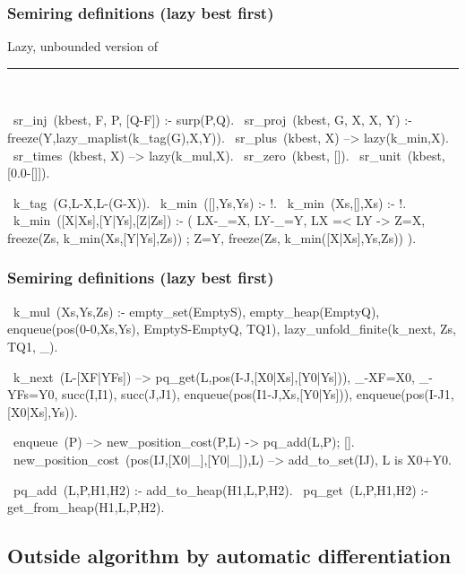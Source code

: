 \documentclass[usenames,dvipsnames]{beamer}
\newenvironment{isframe}[1][untitled]{\begin{frame}[fragile=singleslide,environment=isframe]\frametitle{#1}}{\end{frame}}
\begin{document}
\begin{isframe}[Semiring definitions (lazy best first)]
Lazy, unbounded version of \citet{HuangChiang2005}
\rule{\linewidth}{0.4pt}\\
\begin{prolog}[xleftmargin=0em,basicstyle=\small]
	~sr_inj~(kbest,   F, P, [Q-F]) :- surp(P,Q).
	~sr_proj~(kbest,  G, X, X, Y)  :- freeze(Y,lazy_maplist(k_tag(G),X,Y)).
	~sr_plus~(kbest,  X) --> lazy(k_min,X).
	~sr_times~(kbest, X) --> lazy(k_mul,X).
	~sr_zero~(kbest,  []).
	~sr_unit~(kbest,  [0.0-[]]).

	~k_tag~(G,L-X,L-(G-X)).
	~k_min~([],Ys,Ys) :- !.
	~k_min~(Xs,[],Xs) :- !.
	~k_min~([X|Xs],[Y|Ys],[Z|Zs]) :-
		 (  LX-_=X, LY-_=Y, LX =< LY
		 -> Z=X, freeze(Zs, k_min(Xs,[Y|Ys],Zs))
		 ;  Z=Y, freeze(Zs, k_min([X|Xs],Ys,Zs))
		 ).
\end{prolog}
\end{isframe}

\begin{isframe}[Semiring definitions (lazy best first)]
\begin{prolog}[xleftmargin=0em,basicstyle=\small]
	~k_mul~(Xs,Ys,Zs) :-
		 empty_set(EmptyS), empty_heap(EmptyQ),
		 enqueue(pos(0-0,Xs,Ys), EmptyS-EmptyQ, TQ1),
		 lazy_unfold_finite(k_next, Zs, TQ1, _).

	~k_next~(L-[XF|YFs]) -->
		 \> pq_get(L,pos(I-J,[X0|Xs],[Y0|Ys])),
		 {_-XF=X0, _-YFs=Y0, succ(I,I1), succ(J,J1)},
		 enqueue(pos(I1-J,Xs,[Y0|Ys])),
		 enqueue(pos(I-J1,[X0|Xs],Ys)).

	~enqueue~(P) --> new_position_cost(P,L) -> \> pq_add(L,P); [].
	~new_position_cost~(pos(IJ,[X0|_],[Y0|_]),L) -->
    \< add_to_set(IJ), {L is X0+Y0}.

	~pq_add~(L,P,H1,H2) :- add_to_heap(H1,L,P,H2).
	~pq_get~(L,P,H1,H2) :- get_from_heap(H1,L,P,H2).
\end{prolog}
\end{isframe}

\subsection{Outside algorithm by automatic differentiation}
\end{document}

